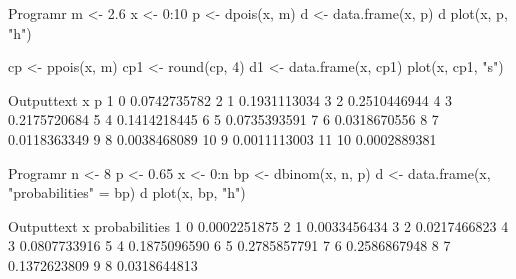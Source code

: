 \begin{code}
    {Program}{r}
m <- 2.6
x <- 0:10
p <- dpois(x, m)
d <- data.frame(x, p)
d
plot(x, p, "h")

cp <- ppois(x, m)
cp1 <- round(cp, 4)
d1 <- data.frame(x, cp1)
plot(x, cp1, "s")
\end{code}
\newpage
\begin{code}
    {Output}{text}
    x            p
1   0 0.0742735782
2   1 0.1931113034
3   2 0.2510446944
4   3 0.2175720684
5   4 0.1414218445
6   5 0.0735393591
7   6 0.0318670556
8   7 0.0118363349
9   8 0.0038468089
10  9 0.0011113003
11 10 0.0002889381
\end{code}

\begin{code}
    {Program}{r}
n <- 8
p <- 0.65
x <- 0:n
bp <- dbinom(x, n, p)
d <- data.frame(x, "probabilities" = bp)
d
plot(x, bp, "h")
\end{code}
\begin{code}
    {Output}{text}
  x probabilities
1 0  0.0002251875
2 1  0.0033456434
3 2  0.0217466823
4 3  0.0807733916
5 4  0.1875096590
6 5  0.2785857791
7 6  0.2586867948
8 7  0.1372623809
9 8  0.0318644813
\end{code}
\newpage
{}

